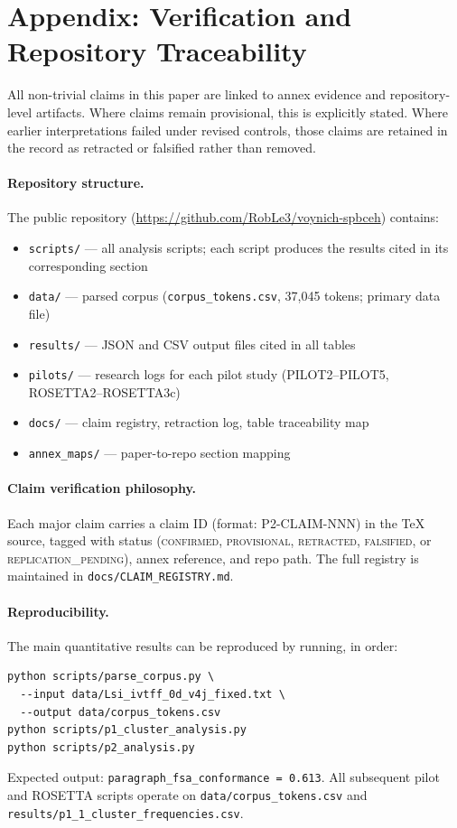 \documentclass[11pt,a4paper,twocolumn]{article}
\begin{document}
\section*{Appendix: Verification and Repository Traceability}
\label{sec:verification}

All non-trivial claims in this paper are linked to annex evidence and repository-level artifacts. Where claims remain provisional, this is explicitly stated. Where earlier interpretations failed under revised controls, those claims are retained in the record as retracted or falsified rather than removed.

\paragraph{Repository structure.}
The public repository (\url{https://github.com/RobLe3/voynich-spbceh}) contains:
\begin{itemize}[noitemsep]
  \item \texttt{scripts/} — all analysis scripts; each script produces the results cited in its corresponding section
  \item \texttt{data/} — parsed corpus (\texttt{corpus\_tokens.csv}, 37,045 tokens; primary data file)
  \item \texttt{results/} — JSON and CSV output files cited in all tables
  \item \texttt{pilots/} — research logs for each pilot study (PILOT2--PILOT5, ROSETTA2--ROSETTA3c)
  \item \texttt{docs/} — claim registry, retraction log, table traceability map
  \item \texttt{annex\_maps/} — paper-to-repo section mapping
\end{itemize}

\paragraph{Claim verification philosophy.}
Each major claim carries a claim ID (format: P2-CLAIM-NNN) in the \TeX{} source, tagged with status (\textsc{confirmed}, \textsc{provisional}, \textsc{retracted}, \textsc{falsified}, or \textsc{replication\_pending}), annex reference, and repo path. The full registry is maintained in \texttt{docs/CLAIM\_REGISTRY.md}.

\paragraph{Reproducibility.}
The main quantitative results can be reproduced by running, in order:
\begin{verbatim}
python scripts/parse_corpus.py \
  --input data/Lsi_ivtff_0d_v4j_fixed.txt \
  --output data/corpus_tokens.csv
python scripts/p1_cluster_analysis.py
python scripts/p2_analysis.py
\end{verbatim}
Expected output: \texttt{paragraph\_fsa\_conformance = 0.613}. All subsequent pilot and ROSETTA scripts operate on \texttt{data/corpus\_tokens.csv} and \texttt{results/p1\_1\_cluster\_frequencies.csv}.
\end{document}
